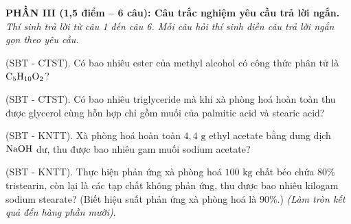 \documentclass[12pt,a4paper]{article}
\begin{document}
\vspace{0.3cm}
\noindent
\textbf{PHẦN III (1,5 điểm -- 6 câu): Câu trắc nghiệm yêu cầu trả lời ngắn.}\\
\textit{Thí sinh trả lời từ câu 1 đến câu 6. Mỗi câu hỏi thí sinh điền câu trả lời ngắn gọn theo yêu cầu.}

\setcounter{ex}{0}

\begin{ex}
(SBT - CTST). Có bao nhiêu ester của methyl alcohol có công thức phân tử là $\ce{C5H10O2}$?
\end{ex}

\begin{ex}
(SBT - CTST). Có bao nhiêu triglyceride mà khi xà phòng hoá hoàn toàn thu được glycerol cùng hỗn hợp chỉ gồm muối của palmitic acid và stearic acid?
\end{ex}

\begin{ex}
(SBT - KNTT). Xà phòng hoá hoàn toàn $4{,}4\text{ g}$ ethyl acetate bằng dung dịch $\ce{NaOH}$ dư, thu được bao nhiêu gam muối sodium acetate?
\end{ex}

\begin{ex}
(SBT - KNTT). Thực hiện phản ứng xà phòng hoá $100\text{ kg}$ chất béo chứa 80\% tristearin, còn lại là các tạp chất không phản ứng, thu được bao nhiêu kilogam sodium stearate? (Biết hiệu suất phản ứng xà phòng hoá là 90\%.) \textit{(Làm tròn kết quả đến hàng phần mười)}.
\end{ex}
\end{document}
